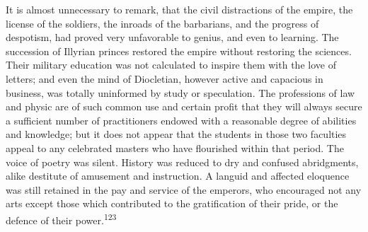 It is almost unnecessary to remark, that the civil distractions
of the empire, the license of the soldiers, the inroads of the
barbarians, and the progress of despotism, had proved very
unfavorable to genius, and even to learning. The succession of
Illyrian princes restored the empire without restoring the
sciences. Their military education was not calculated to inspire
them with the love of letters; and even the mind of Diocletian,
however active and capacious in business, was totally uninformed
by study or speculation. The professions of law and physic are of
such common use and certain profit that they will always secure a
sufficient number of practitioners endowed with a reasonable
degree of abilities and knowledge; but it does not appear that
the students in those two faculties appeal to any celebrated
masters who have flourished within that period. The voice of
poetry was silent. History was reduced to dry and confused
abridgments, alike destitute of amusement and instruction. A
languid and affected eloquence was still retained in the pay and
service of the emperors, who encouraged not any arts except those
which contributed to the gratification of their pride, or the
defence of their power.\textsuperscript{123}


